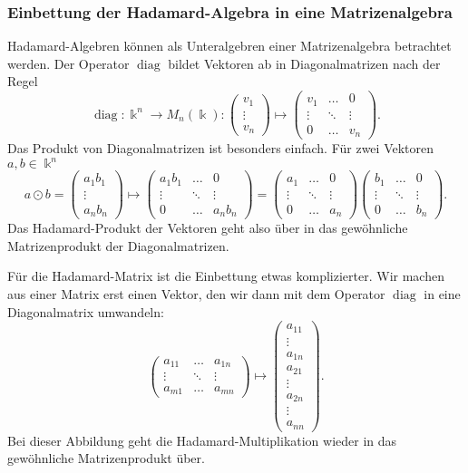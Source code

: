 \subsubsection{Einbettung der Hadamard-Algebra in eine Matrizenalgebra}
Hadamard-Algebren können als Unteralgebren einer Matrizenalgebra
betrachtet werden.
Der Operator $\operatorname{diag}$ bildet Vektoren ab in Diagonalmatrizen
nach der Regel
\[
\operatorname{diag}
\colon
\Bbbk^n \to M_n(\Bbbk)
:
\begin{pmatrix}
v_1\\
\vdots\\
v_n
\end{pmatrix}
\mapsto
\begin{pmatrix}
v_1&\dots&0\\
\vdots&\ddots&\vdots\\
0&\dots&v_n
\end{pmatrix}.
\]
Das Produkt von Diagonalmatrizen ist besonders einfach.
Für zwei Vektoren $a,b\in\Bbbk^n$ 
\[
a\odot b
=
\begin{pmatrix}
a_1b_1\\
\vdots\\
a_nb_n
\end{pmatrix}
\mapsto
\begin{pmatrix}
a_1b_1&\dots&0\\
\vdots&\ddots&\vdots\\
0&\dots&a_nb_n
\end{pmatrix}
=
\begin{pmatrix}
a_1&\dots&0\\
\vdots&\ddots&\vdots\\
0&\dots&a_n
\end{pmatrix}
\begin{pmatrix}
b_1&\dots&0\\
\vdots&\ddots&\vdots\\
0&\dots&b_n
\end{pmatrix}.
\]
Das Hadamard-Produkt der Vektoren geht also über in das gewöhnliche
Matrizenprodukt der Diagonalmatrizen.

Für die Hadamard-Matrix ist die Einbettung etwas komplizierter.
Wir machen aus einer Matrix erst einen Vektor, den wir dann mit
dem Operator $\operatorname{diag}$ in eine Diagonalmatrix umwandeln:
\[
\begin{pmatrix}
a_{11}&\dots &a_{1n}\\
\vdots&\ddots&\vdots\\
a_{m1}&\dots &a_{mn}
\end{pmatrix}
\mapsto
\begin{pmatrix}
a_{11}\\
\vdots\\
a_{1n}\\
a_{21}\\
\vdots\\
a_{2n}\\
\vdots\\
a_{nn}
\end{pmatrix}.
\]
Bei dieser Abbildung geht die Hadamard-Multiplikation wieder in
das gewöhnliche Matrizenprodukt über.

